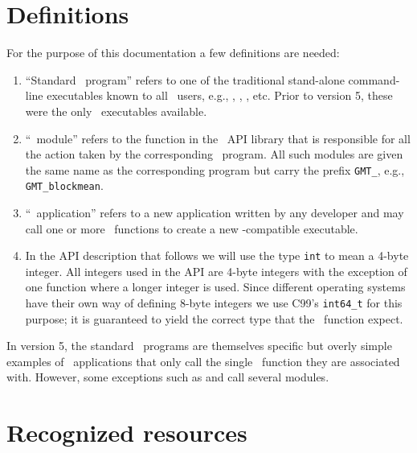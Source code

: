 \documentclass[11pt]{report}
\begin{document}
\section{Definitions}

For the purpose of this documentation a few definitions are needed:

\begin{enumerate}
\item ``Standard \GMT\ program'' refers to one of the traditional stand-alone command-line
executables known to all \GMT\ users, e.g., , ,
, etc.  Prior to version 5, these were the only \GMT\ executables available.
\item ``\GMT\ module'' refers to the function in the \GMT\ API
library that is responsible for all the action taken by the corresponding \GMT\ program.  All
such modules are given the same name as the corresponding program but carry the
prefix \texttt{GMT\_}, e.g., \texttt{GMT\_blockmean}.
\item ``\GMT\ application'' refers to a new application written by any developer
and may call one or more \GMT\ functions to create a new \GMT-compatible executable.
\item In the API description that follows we will use the type \texttt{int} to mean
a 4-byte integer.  All integers used in the API are 4-byte integers with the exception
of one function where a longer integer is used.  Since different operating systems have their
own way of defining 8-byte integers we use C99's \texttt{int64\_t} for this purpose; it is guaranteed to yield
the correct type that the \GMT\ function expect.
\end{enumerate}
In version 5, the standard \GMT\ programs are themselves specific but overly simple examples
of \GMT\ applications that only call the single \GMT\ function they are associated with.
However, some exceptions such as  and  call several modules.

\section{Recognized resources}
\end{document}
